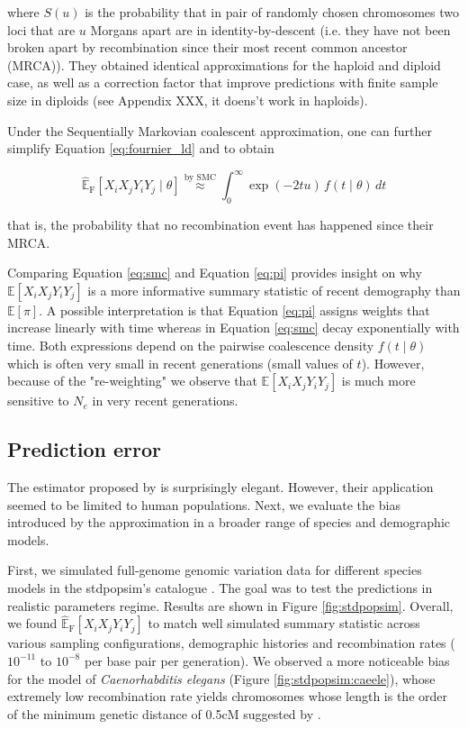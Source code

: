 \documentclass[12pt]{article}
\begin{document}
where $S(u)$ is the probability that in pair of randomly chosen chromosomes two loci that are $u$ Morgans apart are in identity-by-descent (i.e. they have not been broken apart by recombination since their most recent common ancestor (MRCA)). They obtained identical approximations for the haploid and diploid case, as well as a correction factor that improve predictions with finite sample size in diploids (see Appendix XXX, it doens't work in haploids).

Under the Sequentially Markovian coalescent approximation, one can further simplify Equation \ref{eq:fournier_ld} and to obtain

\begin{equation}
	\widehat{\mathbb E}_{\mathrm{F}}[X_iX_jY_iY_j \mid \theta] \stackrel{\text{by SMC}}{\approx} \int_0^\infty \exp(-2tu)\, f(t \mid \theta)\, dt
	\label{eq:smc}
\end{equation}

that is, the probability that no recombination event has happened since their MRCA.

Comparing Equation \ref{eq:smc} and Equation \ref{eq:pi} provides insight on why $\mathbb E[X_iX_jY_iY_j]$ is a more informative summary statistic of recent demography than $\mathbb E[\pi]$. A possible interpretation is that Equation \ref{eq:pi} assigns weights that increase linearly with time whereas in Equation \ref{eq:smc} decay exponentially with time. Both expressions depend on the pairwise coalescence density $f(t \mid \theta)$ which is often very small in recent generations (small values of $t$). However, because of the "re-weighting" we observe that $\mathbb E[X_iX_jY_iY_j]$ is much more sensitive to $N_e$ in very recent generations.

\subsection{Prediction error}

The estimator proposed by \citet{Fournier_2023} is surprisingly elegant. However, their application seemed to be limited to human populations. Next, we evaluate the bias introduced by the approximation in a broader range of species and demographic models.

First, we simulated full-genome genomic variation data for different species models in the stdpopsim's catalogue \citep{Lauterbur_2023}. The goal was to test the predictions in realistic parameters regime. Results are shown in Figure \ref{fig:stdpopsim}. Overall, we found $\widehat{\mathbb E}_{\mathrm{F}}[X_iX_jY_iY_j]$ to match well simulated summary statistic across various sampling configurations, demographic histories and recombination rates ($10^{-11}$ to $10^{-8}$ per base pair per generation). We observed a more noticeable bias for the model of \textit{Caenorhabditis elegans} (Figure \ref{fig:stdpopsim:caeele}), whose extremely low recombination rate yields chromosomes whose length is the order of the minimum genetic distance of 0.5cM  suggested by \citet{Fournier_2023}.
\end{document}
